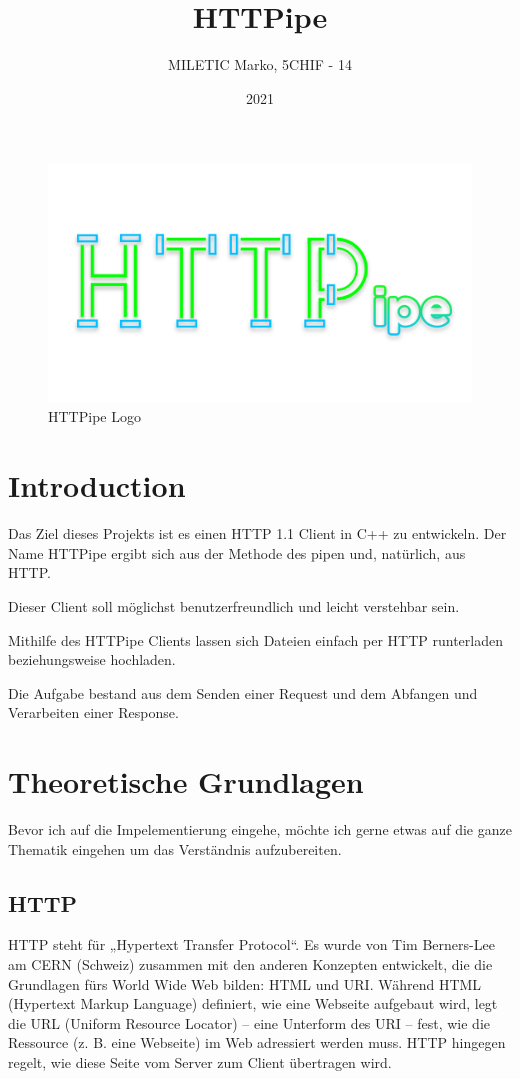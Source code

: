 \documentclass{article}
\title{HTTPipe}
\author{MILETIC Marko, 5CHIF - 14}
\date{2021}
\begin{document}
\lstset{style=mystyle}


\maketitle

\begin{figure}[h!]
\centering
\includegraphics[scale=0.2]{HTTPipe.png}
\caption{HTTPipe Logo}
\label{fig:logo}
\end{figure}

\newpage
\tableofcontents
\newpage

\section{Introduction}
Das Ziel dieses Projekts ist es einen HTTP 1.1 Client in C++ zu entwickeln. Der Name HTTPipe ergibt sich aus der Methode des pipen und, natürlich, aus HTTP. \newline 

\noindent Dieser Client soll möglichst benutzerfreundlich und leicht verstehbar sein.

\noindent Mithilfe des HTTPipe Clients lassen sich Dateien einfach per HTTP runterladen beziehungsweise hochladen.\newline 

\noindent Die Aufgabe bestand aus dem Senden einer Request und dem Abfangen und Verarbeiten einer Response.


\section{Theoretische Grundlagen}
Bevor ich auf die Impelementierung eingehe, möchte ich gerne etwas auf die ganze Thematik eingehen um das Verständnis aufzubereiten.

\subsection{HTTP}
HTTP steht für „Hypertext Transfer Protocol“. Es wurde von Tim Berners-Lee am CERN (Schweiz) zusammen mit den anderen Konzepten entwickelt, die die Grundlagen fürs World Wide Web bilden: HTML und URI. Während HTML (Hypertext Markup Language) definiert, wie eine Webseite aufgebaut wird, legt die URL (Uniform Resource Locator) – eine Unterform des URI – fest, wie die Ressource (z. B. eine Webseite) im Web adressiert werden muss. HTTP hingegen regelt, wie diese Seite vom Server zum Client übertragen wird.
\end{document}
